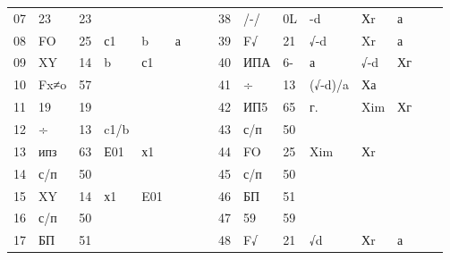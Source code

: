 \documentclass[11pt,a4paper,oneside]{article}
\begin{document}
\begin{table}[]
\begin{tabular}{|l|l|l|l|l|l|l|l|l|l|l|l|l|l|l|l|}
07    & 23      & 23  &        &     &     &   &    & 38    & /-/                                                          & 0L  & -d                                                            & Хr  & а  &   &        \\
08    & FO      & 25  & с1     & b   & а   &   &    & 39    & F√ & 21  & √-d  & Xr  & а  &   & \\
09    & XY      & 14  & b      & с1  &     &   &    & 40    & ИПА                                                          & 6-  & а                                                             & √-d & Хг &   &        \\
10    & Fx≠o    & 57  &        &     &     &   &    & 41    & ÷                                                            & 13  & (√-d)/a                                                       & Ха  &    &   &        \\
11    & 19      & 19  &        &     &     &   &    & 42    & ИП5                                                          & 65  & г.                                                            & Xim & Хг &   &        \\
12    & ÷       & 13  & c1/b   &     &     &   &    & 43    & с/п                                                          & 50  &                                                               &     &    &   &        \\
13    & ипз     & 63  & Е01    & х1  &     &   &    & 44    & FO                                                           & 25  & Xim                                                           & Хr  &    &   &        \\
14    & с/п     & 50  &        &     &     &   &    & 45    & с/п                                                          & 50  &                                                               &     &    &   &        \\
15    & XY      & 14  & х1     & E01 &     &   &    & 46    & БП                                                           & 51  &                                                               &     &    &   &        \\
16    & с/п     & 50  &        &     &     &   &    & 47    & 59                                                           & 59  &                                                               &     &    &   &        \\
17    & БП      & 51  &        &     &     &   &    & 48    & F√                                                           & 21  & √d                                                            & Хr  & а  &   &        \\

\end{tabular}
\end{table}
\end{document}
